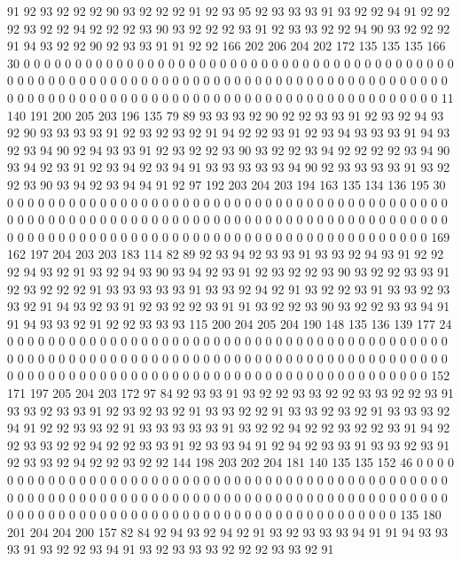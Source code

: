 91 92 93 92 92 92 90 93 92 92 92 91 92 93 95 92 93 93 93 91
93 92 92 94 91 92 92 92 93 92 92 94 92 92 92 93 90 93 92 92
92 93 91 92 93 93 92 92 94 90 93 92 92 92 91 94 93 92 92 90
92 93 93 91 91 92 92 166 202 206 204 202 172 135 135 135 166 30 0 0
0 0 0 0 0 0 0 0 0 0 0 0 0 0 0 0 0 0 0 0
0 0 0 0 0 0 0 0 0 0 0 0 0 0 0 0 0 0 0 0
0 0 0 0 0 0 0 0 0 0 0 0 0 0 0 0 0 0 0 0
0 0 0 0 0 0 0 0 0 0 0 0 0 0 0 0 0 0 0 0
0 0 0 0 0 0 0 0 0 0 0 0 0 0 0 0 0 0 0 0
0 0 0 0 0 0 0 0 0 0 0 0 0 0 0 0 0 0 0 0
0 0 0 0 0 11 140 191 200 205 203 196 135 79 89 93 93 93 92 90
92 92 93 93 91 92 93 92 94 93 92 90 93 93 93 93 91 92 93 92
93 92 91 94 92 92 93 91 92 93 94 93 93 93 91 94 93 92 93 94
90 92 94 93 93 91 92 93 92 92 93 90 93 92 92 93 94 92 92 92
92 93 94 90 93 94 92 93 91 92 93 94 92 93 94 91 93 93 93 93
93 94 90 92 93 93 93 93 91 93 92 92 93 90 93 94 92 93 94 94
91 92 97 192 203 204 203 194 163 135 134 136 195 30 0 0 0 0 0 0
0 0 0 0 0 0 0 0 0 0 0 0 0 0 0 0 0 0 0 0
0 0 0 0 0 0 0 0 0 0 0 0 0 0 0 0 0 0 0 0
0 0 0 0 0 0 0 0 0 0 0 0 0 0 0 0 0 0 0 0
0 0 0 0 0 0 0 0 0 0 0 0 0 0 0 0 0 0 0 0
0 0 0 0 0 0 0 0 0 0 0 0 0 0 0 0 0 0 0 0
0 0 0 0 0 0 0 0 0 0 0 0 0 0 0 0 0 0 0 0
0 169 162 197 204 203 203 183 114 82 89 92 93 94 92 93 93 91 93 93
92 94 93 91 92 92 92 94 93 92 91 93 92 94 93 90 93 94 92 93
91 92 93 92 92 93 90 93 92 92 93 93 91 92 93 92 92 92 91 93
93 93 93 93 91 93 93 92 94 92 91 93 92 92 93 91 93 93 92 93
93 92 91 94 93 92 93 91 92 93 92 92 93 91 91 93 92 92 93 90
93 92 92 93 93 94 91 91 94 93 93 92 91 92 92 93 93 93 115 200
204 205 204 190 148 135 136 139 177 24 0 0 0 0 0 0 0 0 0 0
0 0 0 0 0 0 0 0 0 0 0 0 0 0 0 0 0 0 0 0
0 0 0 0 0 0 0 0 0 0 0 0 0 0 0 0 0 0 0 0
0 0 0 0 0 0 0 0 0 0 0 0 0 0 0 0 0 0 0 0
0 0 0 0 0 0 0 0 0 0 0 0 0 0 0 0 0 0 0 0
0 0 0 0 0 0 0 0 0 0 0 0 0 0 0 0 0 0 0 0
0 0 0 0 0 0 0 0 0 0 0 0 0 0 0 0 0 152 171 197
205 204 203 172 97 84 92 93 93 91 93 92 92 93 93 92 92 93 93 92
92 93 91 93 93 92 93 93 91 92 93 92 93 92 91 93 93 92 92 91
93 93 92 93 92 91 93 93 93 92 94 91 92 92 93 93 92 91 93 93
93 93 93 91 93 92 92 94 92 92 93 92 92 93 91 94 92 92 93 93
92 92 94 92 92 93 93 91 92 93 93 94 91 92 94 92 93 93 91 93
93 92 93 91 92 93 93 92 94 92 92 93 92 92 144 198 203 202 204 181
140 135 135 152 46 0 0 0 0 0 0 0 0 0 0 0 0 0 0 0
0 0 0 0 0 0 0 0 0 0 0 0 0 0 0 0 0 0 0 0
0 0 0 0 0 0 0 0 0 0 0 0 0 0 0 0 0 0 0 0
0 0 0 0 0 0 0 0 0 0 0 0 0 0 0 0 0 0 0 0
0 0 0 0 0 0 0 0 0 0 0 0 0 0 0 0 0 0 0 0
0 0 0 0 0 0 0 0 0 0 0 0 0 0 0 0 0 0 0 0
0 0 0 0 0 0 0 0 0 0 0 0 0 135 180 201 204 204 200 157
82 84 92 94 93 92 94 92 91 93 92 93 93 93 94 91 91 94 93 93
93 91 93 92 92 93 94 91 93 92 93 93 93 92 92 92 93 93 92 91
